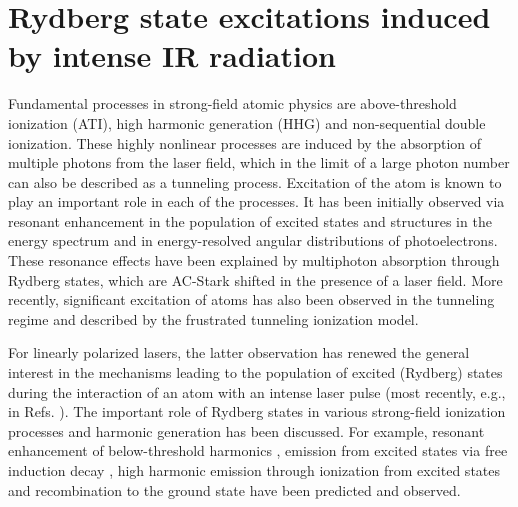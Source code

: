 \chapter{Rydberg state excitations induced by intense IR radiation} %
\label{cha:rydberg_state_excitations}

Fundamental processes in strong-field atomic physics are above-threshold ionization (ATI), high harmonic generation (HHG) and non-sequential double ionization. These highly nonlinear processes are induced by the absorption of multiple photons from the laser field, which in the limit of a large photon number can also be described as a tunneling process. Excitation of the atom is known to play an important role in each of the processes. It has been initially observed via resonant enhancement in the population of excited states \cite{deboer1992,jones1992} and structures in the energy spectrum \cite{freeman1987,perry1989,agostini1989} and in energy-resolved angular distributions \cite{rottke1994} of photoelectrons. These resonance effects have been explained by multiphoton absorption through Rydberg states, which are AC-Stark shifted in the presence of a laser field. More recently, significant excitation of atoms has also been observed in the tunneling regime and described by the frustrated tunneling ionization model. 

For linearly polarized lasers, the latter observation has renewed the general interest in the mechanisms leading to the population of excited (Rydberg) states during the interaction of an atom with an intense laser pulse (most recently, e.g., in Refs. \cite{chini2014,li2014,li2014b,zimmermann2015,shao2015,camp2015,li2015,fechner2015,bredtmann2016,fushitani2016,lv2016,serebryannikov2016,hart2016,li2016,xiong2016,beaulieu2016,larimian2016,zimmermann2017,bengtsson2017,gao2017,ivanov2017,ilchen2017,mancuso2017,xiong2017,piraux2017}). The important role of Rydberg states in various strong-field ionization processes and harmonic generation has been discussed. For example, resonant enhancement of below-threshold harmonics \cite{toma1999,chini2014,camp2015}, emission from excited states via free induction decay \cite{camp2015,beaulieu2016}, high harmonic emission through ionization from excited states and recombination to the ground state \cite{bian2010,beaulieu2016} have been predicted and observed.

